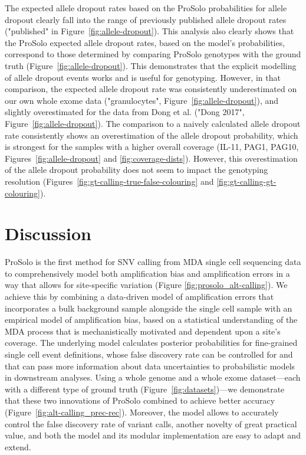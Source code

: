\documentclass[fleqn,12pt,inline]{wlscirep}
\begin{document}
The expected allele dropout rates based on the ProSolo probabilities for allele dropout clearly fall into the range of previously published allele dropout rates\cite{wang_clonal_2014,hou_single-cell_2012,xu_single-cell_2012,ling_evaluation_2009,spits_whole-genome_2006,spits_optimization_2006,renwick_proof_2006,lodato_somatic_2015} ("published" in Figure~\ref{fig:allele-dropout}).
This analysis also clearly shows that the ProSolo expected allele dropout rates, based on the model's probabilities, correspond to those determined by comparing ProSolo genotypes with the ground truth (Figure~\ref{fig:allele-dropout}).
This demonstrates that the explicit modelling of allele dropout events works and is useful for genotyping.
However, in that comparison, the expected allele dropout rate was consistently underestimated on our own whole exome data ("granulocytes", Figure~\ref{fig:allele-dropout}), and slightly overestimated for the data from Dong et al.\cite{dong_accurate_2017} ("Dong 2017", Figure~\ref{fig:allele-dropout}).
The comparison to a naively calculated allele dropout rate consistently shows an overestimation of the allele dropout probability, which is strongest for the samples with a higher overall coverage (IL-11, PAG1, PAG10, Figures~\ref{fig:allele-dropout} and \ref{fig:coverage-dists}).
However, this overestimation of the allele dropout probability does not seem to impact the genotyping resolution (Figures~\ref{fig:gt-calling-true-false-colouring} and \ref{fig:gt-calling-gt-colouring}).


\section{Discussion}

ProSolo is the first method for SNV calling from MDA single cell sequencing data to comprehensively model both amplification bias and amplification errors in a way that allows for site-specific variation (Figure \ref{fig:prosolo_alt-calling}).
We achieve this by combining a data-driven model of amplification errors that incorporates a bulk background sample alongside the single cell sample with an empirical model of amplification bias, based on a statistical understanding of the MDA process that is mechanistically motivated and dependent upon a site's coverage.
The underlying model calculates posterior probabilities for fine-grained single cell event definitions, whose false discovery rate can be controlled for and that can pass more information about data uncertainties to probabilistic models in downstream analyses.
Using a whole genome and a whole exome dataset---each with a different type of ground truth (Figure~\ref{fig:datasets})---we demonstrate that these two innovations of ProSolo combined to achieve better accuracy (Figure~\ref{fig:alt-calling_prec-rec}).
Moreover, the model allows to accurately control the false discovery rate of variant calls, another novelty of great practical value, and both the model and its modular implementation are easy to adapt and extend.
\end{document}
